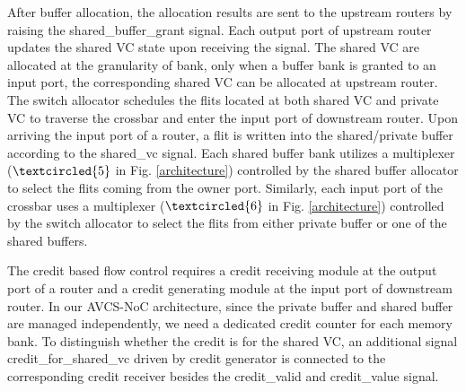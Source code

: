 \documentclass[10pt,conference]{IEEEtran}
\begin{document}
After buffer allocation, the allocation results are sent to the upstream routers by raising the shared\_buffer\_grant signal. Each output port of upstream router updates the shared VC state upon receiving the signal. The shared VC are allocated at the granularity of bank, only when a buffer bank is granted to an input port, the corresponding shared VC can be allocated at upstream router. The switch allocator schedules the flits located at both shared VC and private VC to traverse the crossbar and enter the input port of downstream router. Upon arriving the input port of a router, a flit is written into the shared/private buffer according to the shared\_vc signal. Each shared buffer bank utilizes a multiplexer ($\textcircled{5}$ in Fig. \ref{architecture}) controlled by the shared buffer allocator to select the flits coming from the owner port. Similarly, each input port of the crossbar uses a multiplexer ($\textcircled{6}$ in Fig. \ref{architecture}) controlled by the switch allocator to select the flits from either private buffer or one of the shared buffers.

The credit based flow control requires a credit receiving module at the output port of a router and a credit generating module at the input port of downstream router. In our AVCS-NoC architecture, since the private buffer and shared buffer are managed independently, we need a dedicated credit counter for each memory bank. To distinguish whether the credit is for the shared VC, an additional signal credit\_for\_shared\_vc driven by credit generator is connected to the corresponding credit receiver besides the credit\_valid and credit\_value signal.

\end{document}

